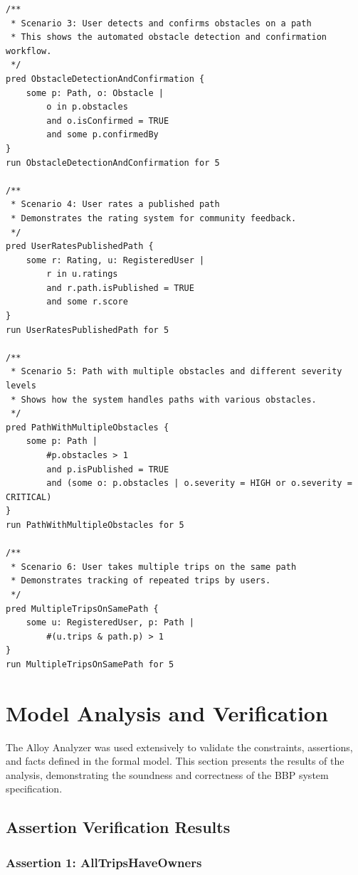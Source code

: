 \begin{lstlisting}
/**
 * Scenario 3: User detects and confirms obstacles on a path
 * This shows the automated obstacle detection and confirmation workflow.
 */
pred ObstacleDetectionAndConfirmation {
    some p: Path, o: Obstacle |
        o in p.obstacles
        and o.isConfirmed = TRUE
        and some p.confirmedBy
}
run ObstacleDetectionAndConfirmation for 5

/**
 * Scenario 4: User rates a published path
 * Demonstrates the rating system for community feedback.
 */
pred UserRatesPublishedPath {
    some r: Rating, u: RegisteredUser |
        r in u.ratings
        and r.path.isPublished = TRUE
        and some r.score
}
run UserRatesPublishedPath for 5

/**
 * Scenario 5: Path with multiple obstacles and different severity levels
 * Shows how the system handles paths with various obstacles.
 */
pred PathWithMultipleObstacles {
    some p: Path |
        #p.obstacles > 1
        and p.isPublished = TRUE
        and (some o: p.obstacles | o.severity = HIGH or o.severity = CRITICAL)
}
run PathWithMultipleObstacles for 5

/**
 * Scenario 6: User takes multiple trips on the same path
 * Demonstrates tracking of repeated trips by users.
 */
pred MultipleTripsOnSamePath {
    some u: RegisteredUser, p: Path |
        #(u.trips & path.p) > 1
}
run MultipleTripsOnSamePath for 5

\end{lstlisting}

\vspace{0.5cm}

\section{Model Analysis and Verification}
\label{sec:model_analysis}%

The Alloy Analyzer was used extensively to validate the constraints, assertions, and facts defined in the formal model. This section presents the results of the analysis, demonstrating the soundness and correctness of the BBP system specification.

\subsection{Assertion Verification Results}
\label{subsec:assertion_verification}%

\subsubsection{Assertion 1: AllTripsHaveOwners}
